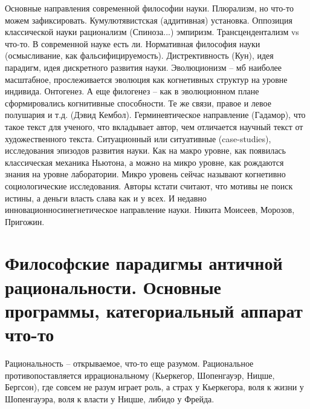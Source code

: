 \documentclass[a4paper, 12pt]{article}
\def\-{\babelhyphen{hard}}
\begin{document}
Основные направления современной философии науки. Плюрализм, но что-то 
можем зафиксировать.
Кумулютявистская (аддитивная) установка. Оппозиция классической 
науки рационализм (Спиноза...) эмпиризм. Трансцендентализм vs 
что-то.
В современной науке есть ли. Нормативная философия науки 
(осмысливание, как фальсифицируемость). Дистрективность (Кун), идея 
парадигм, идея дискретного развития науки. Эволюционизм -- мб наиболее 
масштабное, прослеживается эволюция как когнетивных структур на уровне 
индивида. Онтогенез. А еще филогенез -- как в эволюционном плане 
сформировались когнитивные способности. Те же связи, правое и левое 
полушария и т.д. (Дэвид Кембол). Герминевтическое направление (Гадамор), 
что такое текст для ученого, что вкладывает автор, чем отличается 
научный текст от художественного текста. Ситуационный или ситуативные 
(case-studies), исследования эпизодов развития науки. Как на макро 
уровне, как появилась классическая механика Ньютона, а можно на микро 
уровне, как рождаются знания на уровне лаборатории. Микро уровень сейчас 
называют когнетивно социологические исследования. Авторы кстати считают, 
что мотивы не поиск истины, а деньги власть слава как и у всех. 
И недавно инновационно\-синегнетическое направление науки. Никита 
Моисеев, Морозов, Пригожин.


\section{Философские парадигмы античной рациональности. Основные 
программы, категориальный аппарат что-то}

Рациональность -- открываемое, что-то еще разумом. Рациональное 
противопоставляется иррациональному (Кьеркегор, Шопенгауэр, Ницше, 
Бергсон), где совсем не разум играет роль, а страх у Кьеркегора, воля 
к жизни у Шопенгауэра, воля к власти у Ницше, либидо у Фрейда.
\end{document}
